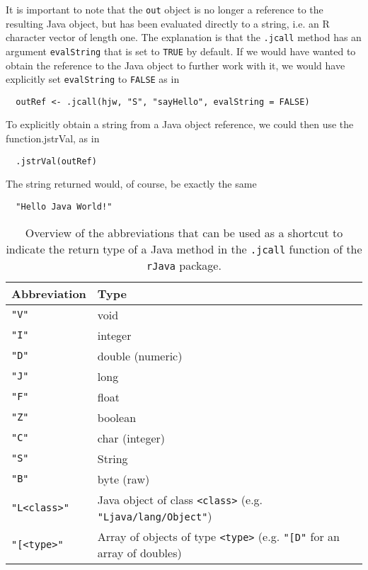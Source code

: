 \documentclass[a4paper, 11pt]{article}
\begin{document}
It is important to note that the \texttt{out} object is
no longer a reference to the resulting Java object, but has been evaluated directly
to a string, i.e. an R character vector of length one. The explanation is that the
\texttt{.jcall} method has an argument \texttt{evalString} that is set to 
\texttt{TRUE} by default. If we would have wanted to obtain the reference to
the Java object to further work with it, we would have explicitly 
set \texttt{evalString} to \texttt{FALSE} as in 

\begin{verbatim}
  outRef <- .jcall(hjw, "S", "sayHello", evalString = FALSE) 
\end{verbatim}

To explicitly obtain a string from a Java object reference,
we could then use the function{.jstrVal}, as in
\begin{verbatim}
  .jstrVal(outRef)
\end{verbatim}

The string returned would, of course, be exactly the same
\begin{verbatim}
  "Hello Java World!"
\end{verbatim}

\begin{table}
  \begin{tabular}{lp{8cm}}
  \hline
  Abbreviation   &  Type \\
  \hline
    \texttt{"V"} & void \\
    \texttt{"I"} & integer \\
    \texttt{"D"} & double (numeric) \\  
    \texttt{"J"} & long \\
    \texttt{"F"} & float \\
    \texttt{"Z"} & boolean \\
    \texttt{"C"} & char (integer)\\
    \texttt{"S"} & String \\
    \texttt{"B"} & byte (raw)\\
    \texttt{"L<class>"} & Java object of class \texttt{<class>} 
                       (e.g. \texttt{"Ljava/lang/Object"})\\
    \texttt{"[<type>"}  & Array of objects of type \texttt{<type>} 
                       (e.g. \texttt{"[D"} for an array of doubles)\\
  \hline
  \end{tabular}
  \caption{Overview of the abbreviations that can be used as a shortcut to indicate the
           return type of a Java method in the \texttt{.jcall} function of
           the \texttt{rJava} package.}
  \label{tab:returntypes}
\end{table} 
\end{document}
